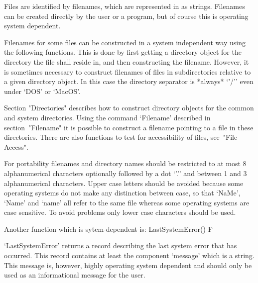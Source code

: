 


Files are identified by filenames, which are represented in {\GAP} as
strings.  Filenames can be created directly by the user or a program, but
of course this is operating system dependent.

Filenames for some files can  be constructed in  a system independent way
using the following functions.  This is done by first getting a directory
object for the directory the file shall  reside in, and then constructing
the filename.  However, it is  sometimes necessary to construct filenames
of files in subdirectories relative to a given directory object.  In this
case  the  directory separator is  *always*  `{'/'}' even under  `DOS' or
`MacOS'.

Section "Directories" describes how  to  construct directory objects
for the common {\GAP} and system directories.
Using the command `Filename' described in section~"Filename"
it is possible to construct a filename pointing to a file in these
directories.
There are also functions to test for accessibility of files,
see~"File Access".


For portability filenames and directory  names should be restricted to at
most   8 alphanumerical characters  optionally followed  by a dot `{'.'}'
and between 1 and 3 alphanumerical characters.  Upper case letters should
be  avoided because some  operating systems  do  not make any distinction
between case,  so that `NaMe', `Name'  and  `name' all  refer to the same
file  whereas  some   operating  systems are case   sensitive.   To avoid
problems only lower case characters should be used.

Another function which is sytem-dependent is:
\>LastSystemError() F

`LastSystemError' returns  a  record describing the   last system error that
has occurred.
This record   contains  at least   the  component  `message' which   is a
string. This message is, however,  highly operating system dependent  and
should only be used as an informational message for the user.

